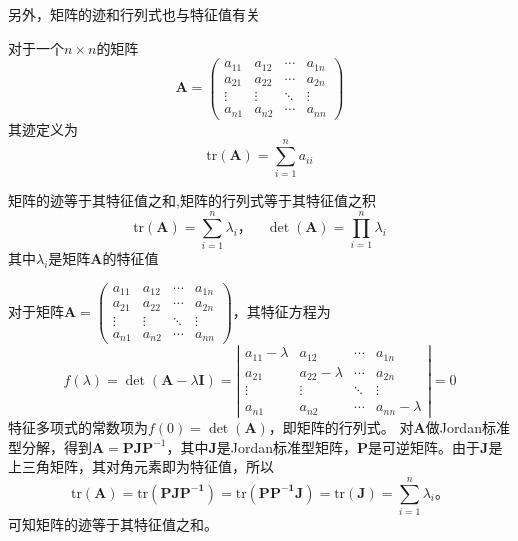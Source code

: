 另外，矩阵的迹和行列式也与特征值有关
\begin{defn}
    对于一个$n \times n$的矩阵
    \begin{equation}
        \mathbf{A}=\begin{pmatrix}
            a_{11} & a_{12} & \cdots & a_{1n} \\
            a_{21} & a_{22} & \cdots & a_{2n} \\
            \vdots & \vdots & \ddots & \vdots \\
            a_{n1} & a_{n2} & \cdots & a_{nn}
        \end{pmatrix}
    \end{equation}
    其迹定义为
    \begin{equation}
        \text{tr}(\mathbf{A}) = \sum_{i=1}^{n} a_{ii}
    \end{equation}
\end{defn}
\begin{thm}\label{thm:trace_det}
    矩阵的迹等于其特征值之和,矩阵的行列式等于其特征值之积
    \begin{equation}
        \text{tr}(\mathbf{A}) = \sum_{i=1}^{n} \lambda_i，\quad \det(\mathbf{A}) = \prod_{i=1}^{n} \lambda_i
    \end{equation}
    其中$\lambda_i$是矩阵$\mathbf{A}$的特征值
\end{thm}
\begin{pf}
   对于矩阵$\mathbf{A}= \begin{pmatrix}
    a_{11} & a_{12} & \cdots & a_{1n} \\
    a_{21} & a_{22} & \cdots & a_{2n} \\
    \vdots & \vdots & \ddots & \vdots \\
    a_{n1} & a_{n2} & \cdots & a_{nn}
\end{pmatrix}$，其特征方程为
\begin{equation}\label{eq:char_eq}
    f(\lambda)=\det(\mathbf{A} - \lambda \mathbf{I}) = \left| \begin{array}{cccc}
        a_{11}-\lambda & a_{12} & \cdots & a_{1n} \\
        a_{21} & a_{22}-\lambda & \cdots & a_{2n} \\
        \vdots & \vdots & \ddots & \vdots \\
        a_{n1} & a_{n2} & \cdots & a_{nn}-\lambda
    \end{array} \right| = 0
\end{equation}
特征多项式的常数项为$f(0)=\det(\mathbf{A})$，即矩阵的行列式。
对$\mathbf{A}$做Jordan标准型分解，得到$\mathbf{A}= \mathbf{P} \mathbf{J} \mathbf{P}^{-1}$，其中$\mathbf{J}$是Jordan标准型矩阵，$\mathbf{P}$是可逆矩阵。由于$\mathbf{J}$是上三角矩阵，其对角元素即为特征值，所以
\begin{equation}
    \text{tr}(\mathbf{A})=\text{tr}(\mathbf{PJP^{-1}})=\text{tr}(\mathbf{PP^{-1}J})=\text{tr}(\mathbf{J})=\sum_{i=1}^{n} \lambda_i。
\end{equation}
可知矩阵的迹等于其特征值之和。
\end{pf}
